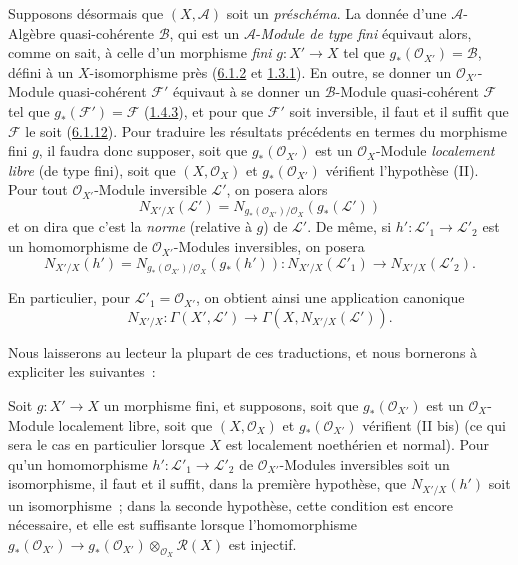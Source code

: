 \begin{env}[6.5.5]
\label{II.6.5.5-fr}
Supposons désormais que $(X,\mathcal{A})$ soit un \emph{préschéma}. La donnée
d'une $\mathcal{A}$-Algèbre quasi-cohérente $\mathcal{B}$, qui est un
$\mathcal{A}$-\emph{Module de type fini} équivaut alors, comme on sait, à
celle d'un morphisme \emph{fini} $g:X'\to X$ tel que
$g_*(\mathcal{O}_{X'})=\mathcal{B}$, défini à un $X$-isomorphisme près
(\hyperref[II.6.1.2-fr]{6.1.2} et \hyperref[II.1.3.1-fr]{1.3.1}). En outre,
se donner un $\mathcal{O}_{X'}$-Module quasi-cohérent $\mathcal{F}'$ équivaut
à se donner un $\mathcal{B}$-Module quasi-cohérent $\mathcal{F}$ tel que
$g_*(\mathcal{F}')=\mathcal{F}$ (\hyperref[II.1.4.3-fr]{1.4.3}), et pour que
$\mathcal{F}'$ soit inversible, il faut et il suffit que $\mathcal{F}$ le soit
(\hyperref[II.6.1.12-fr]{6.1.12}). Pour traduire les résultats précédents en
termes du morphisme fini $g$, il faudra donc supposer, soit que
$g_*(\mathcal{O}_{X'})$ est un $\mathcal{O}_X$-Module \emph{localement libre}
(de type fini), soit que $(X,\mathcal{O}_X)$ et $g_*(\mathcal{O}_{X'})$
vérifient l'hypothèse (II). Pour tout $\mathcal{O}_{X'}$-Module inversible
$\mathcal{L}'$, on posera alors
\[
\label{II.6.5.5.1-fr}
N_{X'/X}(\mathcal{L}')
=N_{g_*(\mathcal{O}_{X'})/\mathcal{O}_X}(g_*(\mathcal{L}'))
\tag{6.5.5.1}
\]
et on dira que c'est la \emph{norme} (relative à $g$) de $\mathcal{L}'$. De
même, si $h':\mathcal{L}'_1\to\mathcal{L}'_2$ est un homomorphisme de
$\mathcal{O}_{X'}$-Modules inversibles, on posera
\[
\label{II.6.5.5.2-fr}
N_{X'/X}(h')
=N_{g_*(\mathcal{O}_{X'})/\mathcal{O}_X}(g_*(h')):
N_{X'/X}(\mathcal{L}'_1)\to N_{X'/X}(\mathcal{L}'_2).
\tag{6.5.5.2}
\]

En particulier, pour $\mathcal{L}'_1=\mathcal{O}_{X'}$, on obtient ainsi une
application canonique
\[
\label{II.6.5.5.3-fr}
N_{X'/X}:\Gamma(X',\mathcal{L}')
\to\Gamma(X,N_{X'/X}(\mathcal{L}')).
\tag{6.5.5.3}
\]

Nous laisserons au lecteur la plupart de ces traductions, et nous bornerons à
expliciter les suivantes~:
\end{env}

\begin{proposition}[6.5.6]
\label{II.6.5.6-fr}
Soit $g:X'\to X$ un morphisme fini, et supposons, soit que
$g_*(\mathcal{O}_{X'})$ est un $\mathcal{O}_X$-Module localement libre, soit
que $(X,\mathcal{O}_X)$ et $g_*(\mathcal{O}_{X'})$ vérifient \textup{(II bis)}
(ce qui sera le cas en particulier lorsque $X$ est localement noethérien et
normal). Pour qu'un homomorphisme $h':\mathcal{L}'_1\to\mathcal{L}'_2$ de
$\mathcal{O}_{X'}$-Modules inversibles soit un isomorphisme, il faut et il
suffit, dans la première hypothèse, que $N_{X'/X}(h')$ soit un isomorphisme~;
dans la seconde hypothèse, cette condition est encore nécessaire, et elle est
suffisante lorsque l'homomorphisme
$g_*(\mathcal{O}_{X'})\to
g_*(\mathcal{O}_{X'})\otimes_{\mathcal{O}_X}\mathcal{R}(X)$ est injectif.
\end{proposition}

